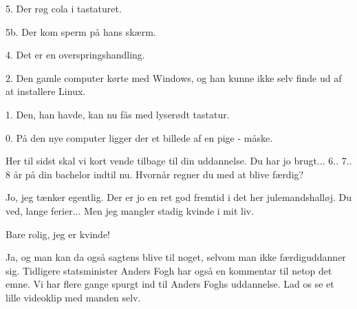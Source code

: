 \documentclass[a4paper,11pt]{article}
\begin{document}
\begin{sketch}

 5. Der røg cola i tastaturet.


 5b. Der kom sperm på hans skærm.


 4. Det er en overspringshandling.


 2. Den gamle computer kørte med Windows, og han kunne ikke selv finde ud af at installere Linux.


 1. Den, han havde, kan nu fås med lyserødt tastatur.


 0. På den nye computer ligger der et billede af en pige - måske.


 Her til sidst skal vi kort vende tilbage til din uddannelse. Du har jo brugt...  6.. 7.. 8  år på din bachelor indtil nu. Hvornår regner du med at blive færdig?

 Jo, jeg tænker egentlig. Der er jo en ret god fremtid i det her julemandshalløj. Du ved, lange ferier... Men jeg mangler stadig kvinde i mit liv.

  Bare rolig, jeg er kvinde!


 Ja, og man kan da også sagtens blive til noget, selvom man ikke færdiguddanner sig. Tidligere statsminister Anders Fogh har også en kommentar til netop det emne. Vi har flere gange spurgt ind til Anders Foghs uddannelse. Lad os se et lille videoklip med manden selv.


\end{sketch}
\end{document}
